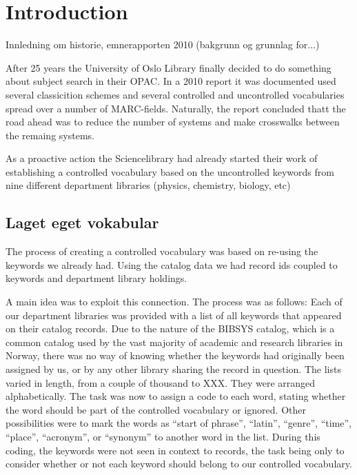 \section{Introduction}

Innledning om historie, emnerapporten 2010 (bakgrunn og grunnlag for...)

After 25 years the University of Oslo Library finally decided to do something about subject search in their OPAC. In a 2010 report it was documented  used several classicition schemes and several controlled and uncontrolled vocabularies spread over a number of MARC-fields. Naturally, the report concluded thatt the  road ahead  was to reduce the number of systems and make crosswalks between the remaing systems.

As a proactive action the Sciencelibrary had already started their work of establishing a  controlled vocabulary based on the uncontrolled keywords from nine different  department libraries (physics, chemistry, biology, etc)

\subsection{Laget eget vokabular}

The process of creating a controlled vocabulary was based on re-using the keywords we already had. Using the catalog data we had record ids coupled to keywords and department library holdings. 

A main idea was to exploit this connection. The process was as follows: Each of our department libraries was provided with a list of all keywords that appeared on their catalog records. Due to the nature of the BIBSYS catalog, which is a common catalog used by the vast majority of academic and research libraries in Norway, there was no way of knowing whether the keywords had originally been assigned by us, or by any other library sharing the record in question. The lists varied in length, from a couple of thousand to XXX. They were arranged alphabetically. The task was now to assign a code to each word, stating whether the word should be part of the controlled vocabulary or ignored. Other possibilities were to mark the words as ``start of phrase'', ``latin'', ``genre'', ``time'', ``place'', ``acronym'', or ``synonym'' to another word in the list. During this coding, the keywords were not seen in context to records, the task being only to consider whether or not each keyword should belong to our controlled vocabulary. 

